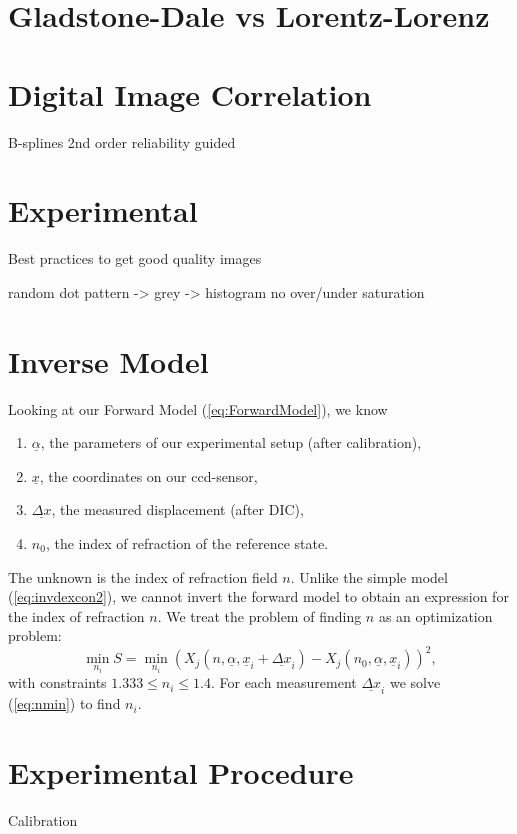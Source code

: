 \documentclass{article}
\begin{document}
\section{Gladstone-Dale vs Lorentz-Lorenz}

\section{Digital Image Correlation}
B-splines
2nd order
reliability guided

\section{Experimental}
Best practices to get good quality images

random dot pattern -> grey -> histogram no over/under saturation 

\section{Inverse Model}
Looking at our Forward Model (\ref{eq:ForwardModel}), we know
\begin{enumerate}
	\item $\underline{\alpha}$, the parameters of our experimental setup (after calibration), \\
	\item $\underline{x}$, the coordinates on our ccd-sensor, \\
	\item $\underline{\Delta x}$, the measured displacement (after DIC), \\
	\item $n_0$, the index of refraction of the reference state.
\end{enumerate}
The unknown is the index of refraction field $n$. Unlike the simple model (\ref{eq:invdexcon2}), we cannot invert the forward model to obtain an expression for the index of refraction $n$. We treat the problem of finding $n$ as an optimization problem:
\begin{equation}
\label{eq:nmin} 
\min_{n_i}  S = \min_{n_i} (X_{j}(n, \underline{\alpha}, \underline{x}_i+\underline{\Delta x}_i) - X_{j}(n_0, \underline{\alpha}, \underline{x}_i))^2, 
\end{equation}
with constraints $1.333 \leq n_i \leq 1.4$. For each measurement $\underline{\Delta x}_i$ we solve (\ref{eq:nmin}) to find $n_i$.
\section{Experimental Procedure}
Calibration
\end{document}

